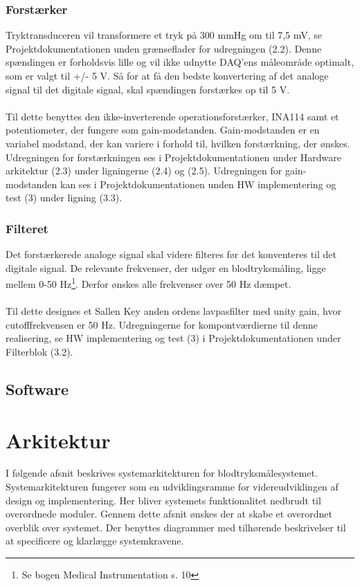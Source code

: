 \subsubsection{Forstærker}
Tryktransduceren vil transformere et tryk på 300 mmHg om til 7,5 mV, se Projektdokumentationen unden grænseflader for udregningen (2.2). Denne spændingen er forholdsvis lille og vil ikke udnytte DAQ'ens måleområde optimalt, som er valgt til +/- 5 V. Så for at få den bedste konvertering af det analoge signal til det digitale signal, skal spændingen forstærkes op til 5 V. 
\\\\
Til dette benyttes den ikke-inverterende operationsforstærker, INA114 samt et potentiometer, der fungere som gain-modstanden. Gain-modstanden er en variabel modstand, der kan variere i forhold til, hvilken forstærkning, der ønskes. Udregningen for forstærkningen ses i Projektdokumentationen under Hardware arkitektur (2.3) under ligningerne (2.4) og (2.5). Udregningen for gain-modstanden kan ses i Projektdokumentationen unden HW implementering og test (3) under ligning (3.3).     

\subsubsection{Filteret}
Det forstærkerede analoge signal skal videre filteres før det konventeres til det digitale signal. De relevante frekvenser, der udgør en blodtryksmåling, ligge mellem 0-50 Hz\footnote{Se bogen Medical Instrumentation s. 10}. Derfor ønskes alle frekvenser over 50 Hz dæmpet.
\\\\
Til dette designes et Sallen Key anden ordens lavpasfilter med unity gain, hvor cutofffrekvensen er 50 Hz. Udregningerne for kompontværdierne til denne realisering, se HW implementering og test (3) i Projektdokumentationen under Filterblok (3.2).

\subsection{Software} 




        

\section{Arkitektur}
I følgende afsnit beskrives systemarkitekturen for blodtryksmålesystemet. Systemarkitekturen fungerer som en udviklingsramme for videreudviklingen af design og implementering. Her bliver systemets funktionalitet nedbrudt til overordnede moduler. Gennem dette afsnit ønskes der at skabe et overordnet overblik over systemet. Der benyttes diagrammer med tilhørende beskrivelser til at specificere og klarlægge systemkravene.

